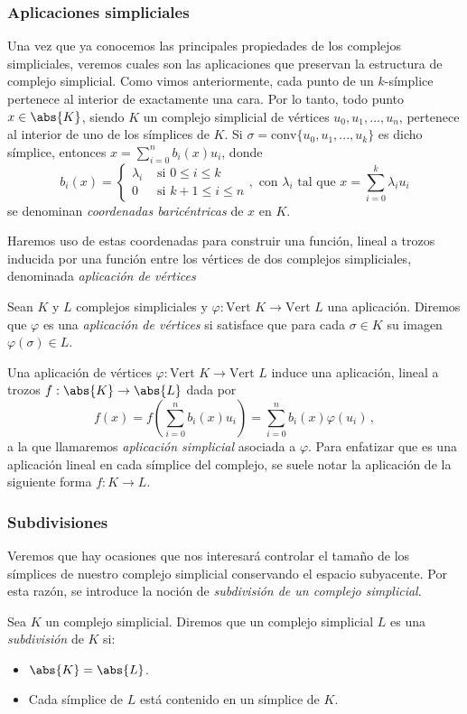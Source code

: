 \subsubsection*{Aplicaciones simpliciales}
Una vez que ya conocemos las principales propiedades de los complejos simpliciales, veremos cuales son las aplicaciones que preservan la estructura de complejo simplicial. Como vimos anteriormente, cada punto de un $k$-símplice pertenece al interior de exactamente una cara. Por lo tanto, todo punto $x \in \abs{K}$, siendo $K$ un complejo simplicial de vértices $u_0, u_1, ..., u_n$, pertenece al interior de uno de los símplices de $K$. Si $\sigma = \text{conv}\{u_0, u_1, ..., u_k\}$ es dicho símplice, entonces $x = \sum_{i=0}^{n} b_i(x)u_i$, donde
\[
b_i(x)=
\begin{cases}
\lambda_i	 & \text{ si } 0 \leq i \leq k \\ 
0 			 & \text{ si } k+1 \leq i \leq n
\end{cases},\text{ con } \lambda_i \text{ tal que } x = \sum_{i=0}^{k} \lambda_i u_i
\]
se denominan \emph{coordenadas baricéntricas} de $x$ en $K$.

Haremos uso de estas coordenadas para construir una función, lineal a trozos inducida por una función entre los vértices de dos complejos simpliciales, denominada \emph{aplicación de vértices}

\begin{definition}
Sean $K$ y $L$ complejos simpliciales y $\varphi:\text{Vert }K \to \text{Vert }L$ una aplicación. Diremos que $\varphi$ es una \emph{aplicación de vértices} si satisface que para cada $\sigma \in K$ su imagen $\varphi(\sigma) \in L$.
\end{definition}

Una aplicación de vértices $\varphi:\text{Vert }K \to \text{Vert }L$ induce una aplicación, lineal a trozos $f: \abs{K} \to \abs{L}$ dada por
\[
f(x) = f\left ( \sum_{i=0}^{n} b_i(x) u_i \right ) =  \sum_{i=0}^{n} b_i(x)\varphi(u_i)\,,
\]
a la que llamaremos \emph{aplicación simplicial} asociada a $\varphi$. Para enfatizar que es una aplicación lineal en cada símplice del complejo, se suele notar la aplicación de la siguiente forma $f: K \to L$. 

\subsubsection*{Subdivisiones}
Veremos que hay ocasiones que nos interesará controlar el tamaño de los símplices de nuestro complejo simplicial conservando el espacio subyacente. Por esta razón, se introduce la noción de \emph{subdivisión de un complejo simplicial}.
\begin{definition}
Sea $K$ un complejo simplicial. Diremos que un complejo simplicial $L$ es una \emph{subdivisión} de $K$ si:
\begin{itemize}
	\item $\abs{K}=\abs{L}$.
	\item Cada símplice de $L$ está contenido en un símplice de $K$.
\end{itemize}
\end{definition}


